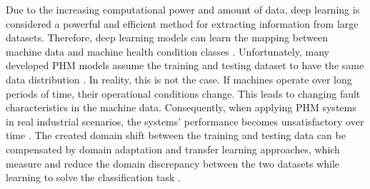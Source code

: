 Due to the increasing computational power and amount of data, deep learning is considered a powerful and efficient method for extracting information from large datasets. Therefore, deep learning models can learn the mapping between machine data and machine health condition classes \cite{ZHAO2019213}. Unfortunately, many developed PHM models assume the training and testing dataset to have the same data distribution \cite{AZAMFAR2020103932}. In reality, this is not the case. If machines operate over long periods of time, their operational conditions change. This leads to changing fault characteristics in the machine data. Consequently, when applying PHM systems in real industrial scenarios, the systems' performance becomes unsatisfactory over time \cite{AZAMFAR2020103932}. The created domain shift between the training and testing data can be compensated by domain adaptation and transfer learning approaches, which measure and reduce the domain discrepancy between the two datasets while learning to solve the classification task \cite{AZAMFAR2020103932}.


